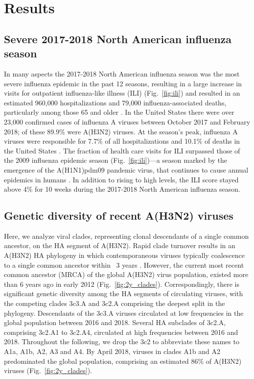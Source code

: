 \section*{Results}
\subsection*{Severe 2017-2018 North American influenza season}
In many aspects the 2017-2018 North American influenza season was the most severe influenza epidemic in the past 12 seasons, resulting in a large increase in visits for outpatient influenza-like illness (ILI) (Fig.~\ref{fig:ili}) and resulted in an estimated 960,000 hospitalizations and 79,000 influenza-associated deaths, particularly among those 65 and older \citep{Estimate3:online}.
In the United States there were over 23,000 confirmed cases of influenza A viruses between October 2017 and February 2018; of these 89.9\% were A(H3N2) viruses.
At the season’s peak, influenza A viruses were responsible for 7.7\% of all hospitalizations and 10.1\% of deaths in the United States \citep{MMWR2018}.
The fraction of health care visits for ILI surpassed those of the 2009 influenza epidemic season (Fig.~\ref{fig:ili})---a season marked by the emergence of the A(H1N1)pdm09 pandemic virus, that continues to cause annual epidemics in humans \citep{garten_antigenic_2009}.
In addition to rising to high levels, the ILI score stayed above 4\% for 10 weeks during the 2017-2018 North American influenza season.

\subsection*{Genetic diversity of recent A(H3N2) viruses}
Here, we analyze viral clades, representing clonal descendants of a single common ancestor, on the HA segment of A(H3N2).
Rapid clade turnover results in an A(H3N2) HA phylogeny in which contemporaneous viruses typically coalescence to a single common ancestor within ~3 years \citep{bedford_global_2015}.
However, the current most recent common ancestor (MRCA) of the global A(H3N2) virus population, existed more than 6 years ago in early 2012 (Fig.~\ref{fig:2y_clades}).
Correspondingly, there is significant genetic diversity among the HA segments of circulating viruses, with the competing clades 3c3.A and 3c2.A comprising the deepest split in the phylogeny.
Descendants of the 3c3.A viruses circulated at low frequencies in the global population between 2016 and 2018.
Several HA subclades of 3c2.A, comprising 3c2.A1 to 3c2.A4, circulated at high frequencies between 2016 and 2018.
Throughout the following, we drop the 3c2 to abbreviate these names to A1a, A1b, A2, A3 and A4.
By April 2018, viruses in clades A1b and A2 predominated the global population, comprising an estimated 86\% of A(H3N2) viruses (Fig.~\ref{fig:2y_clades}).

